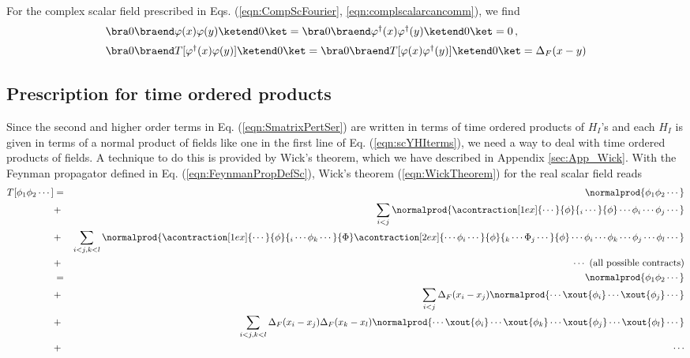 For the complex scalar field prescribed in Eqs. (\ref{eqn:CompScFourier}, \ref{eqn:complscalarcancomm}),
we find 
\begin{eqnarray}
\begin{array}{l}
\bra 0 \braend \varphi(x) \varphi(y) \ketend 0 \ket = 
\bra 0 \braend \varphi^\dagger(x) \varphi^\dagger(y) \ketend 0 \ket = 0\,,
\vspace{2mm}
\\
\bra 0 \braend T[\varphi^\dagger(x) \varphi(y)] \ketend 0 \ket 
= 
\bra 0 \braend T[\varphi(x) \varphi^\dagger(y)] \ketend 0 \ket 
= 
\Delta_F(x-y)
\end{array}
\label{eqn:CplxScProp}
\end{eqnarray}

\subsection{Prescription for time ordered products}
Since the second and higher order terms in Eq. (\ref{eqn:SmatrixPertSer})
are written in terms of time ordered products of $H_I$'s and
each $H_I$ is given in terms of a normal product of fields like
one in the first line of Eq. (\ref{eqn:scYHIterms}), 
we need a way to deal with time ordered products 
of fields. A technique to do this is provided by Wick's theorem, 
which we have described in Appendix \ref{sec:App_Wick}.
With the Feynman propagator defined in Eq. (\ref{eqn:FeynmanPropDefSc}),
Wick's theorem (\ref{eqn:WickTheorem}) for the real scalar field reads
\begin{eqnarray}
T[\phi_1 \phi_2 \cdots ]
&=&
\normalprod{\phi_1 \phi_2 \cdots }
\nonumber\\
&+&
\sum_{i < j}  
\normalprod{
\acontraction[1ex]{\cdots}{\phi}{{}_i\cdots}{\phi}
\cdots \phi_i \cdots \phi_j \cdots
}%
\nonumber\\
&+&
\sum_{i < j, k<l}  
\normalprod{
\acontraction[1ex]{\cdots}{\phi}{{}_i\cdots \phi_k \cdots}{\Phi}
\acontraction[2ex]{\cdots \phi_i \cdots }{\phi}{{}_k\cdots \Phi_j \cdots}{\phi}
\cdots \phi_i \cdots \phi_k \cdots  \phi_j \cdots \phi_l \cdots
}%
\nonumber\\
&+&
\cdots  \mbox{ (all possible contracts)}
\nonumber\\
&=&
\normalprod{\phi_1 \phi_2 \cdots }
\nonumber\\
&+&
\sum_{i < j}  
\Delta_F(x_i - x_j)
\normalprod{
\cdots \xout{\phi_i} \cdots \xout{\phi_j} \cdots
}%
\nonumber\\
&+&
\sum_{i < j, k<l}  
\Delta_F(x_i - x_j)
\Delta_F(x_k - x_l)
\normalprod{
\cdots \xout{\phi_i} \cdots \xout{\phi_k} \cdots  \xout{\phi_j} \cdots \xout{\phi_l} \cdots
}%
\nonumber\\
&+&
\cdots
\nonumber\\
\label{eqn:WickTheoremRealSc}
\end{eqnarray}

